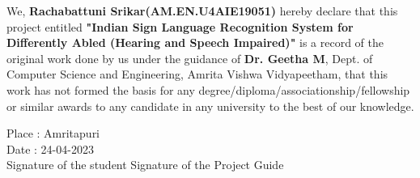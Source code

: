\documentclass[oneside,12pt]{Classes/CUEDthesisPSnPDF}
\begin{document}
\vspace{1pt}

We, \textbf{Rachabattuni Srikar(AM.EN.U4AIE19051)} hereby declare that this project entitled \textbf{"Indian Sign Language Recognition System for Differently Abled (Hearing and Speech Impaired)"} is a record of the original work done by us under the guidance of \textbf{Dr. Geetha M}, Dept. of Computer Science and Engineering, Amrita Vishwa Vidyapeetham, that this work has not formed the basis for any degree/diploma/associationship/fellowship or similar awards to any candidate in any university to the best of our knowledge.\\

\vspace{60pt}

\begin{flushleft}

	Place	:	Amritapuri\\[1ex]

	Date	:	24-04-2023\\[15ex]

	Signature of the student \hspace{90pt}	Signature of the Project Guide\\

\end{flushleft}

\setcounter{secnumdepth}{3}

\setcounter{tocdepth}{3}

\frontmatter %



\end{document}
